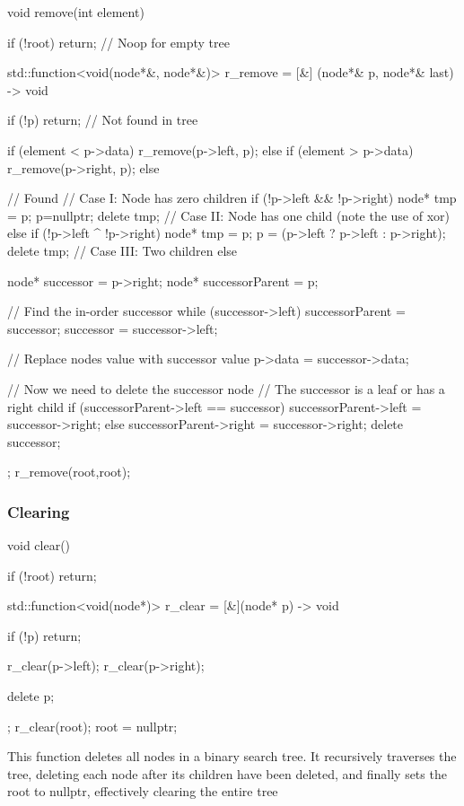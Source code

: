 \documentclass{report}
\begin{document}
\begin{cppcode}
    void remove(int element) {
        if (!root) return; // Noop for empty tree

        std::function<void(node*&, node*&)> r_remove = [&] (node*& p, node*& last) -> void {
            if (!p) return; // Not found in tree

            if (element < p->data) {
                r_remove(p->left, p);
            } else if (element > p->data) {
                r_remove(p->right, p);
            } else { // Found
                // Case I: Node has zero children 
                if (!p->left && !p->right) {
                    node* tmp = p;
                    p=nullptr;
                    delete tmp;
                    // Case II: Node has one child (note the use of xor)
                } else if (!p->left ^ !p->right) {
                    node* tmp = p;
                    p = (p->left ? p->left : p->right);
                    delete tmp;
                    // Case III: Two children
                } else {    
                    node* successor = p->right;
                    node* successorParent = p;

                    // Find the in-order successor 
                    while (successor->left) {
                        successorParent = successor;
                        successor = successor->left;
                    }

                    // Replace nodes value with successor value
                    p->data = successor->data;

                    // Now we need to delete the successor node
                    // The successor is a leaf or has a right child
                    if (successorParent->left == successor) {
                        successorParent->left = successor->right; 
                    } else {
                        successorParent->right = successor->right; 
                    }
                    delete successor;
                }
            }
        };
        r_remove(root,root);
    }
    \end{cppcode}
    \pagebreak 
    \subsubsection{Clearing}
    \bigbreak \noindent 
    \begin{cppcode}
        void clear() {
            if (!root) return;

            std::function<void(node*)> r_clear = [&](node* p) -> void {
                if (!p) return;

                r_clear(p->left);
                r_clear(p->right);

                delete p;
            };
            r_clear(root);
            root = nullptr;
        }
    \end{cppcode}
    \bigbreak \noindent 
    This function deletes all nodes in a binary search tree. It recursively traverses the tree, deleting each node after its children have been deleted, and finally sets the root to nullptr, effectively clearing the entire tree
\end{document}
